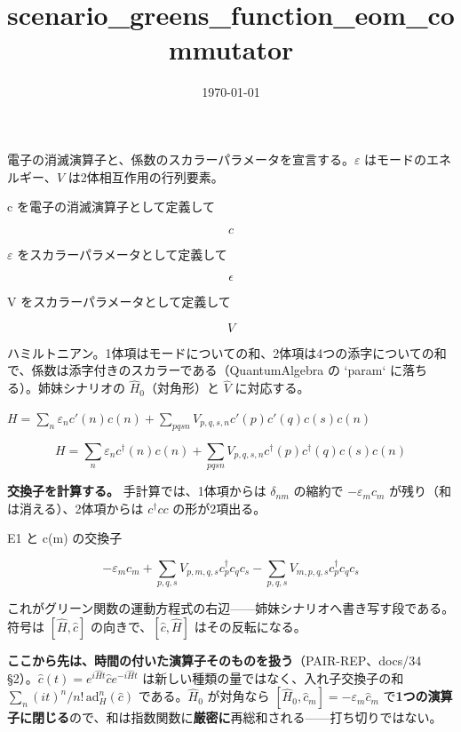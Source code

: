 \documentclass[dvipdfmx,a4paper,11pt]{jsarticle}
\title{scenario\_greens\_function\_eom\_commutator}
\date{\today}
\begin{document}
\maketitle

電子の消滅演算子と、係数のスカラーパラメータを宣言する。$\varepsilon$ はモードのエネルギー、$V$ は2体相互作用の行列要素。

c を電子の消滅演算子として定義して

\[
  c
\]

$\varepsilon$ をスカラーパラメータとして定義して

\[
  \epsilon
\]

V をスカラーパラメータとして定義して

\[
  V
\]

ハミルトニアン。1体項はモードについての和、2体項は4つの添字についての和で、係数は添字付きのスカラーである（QuantumAlgebra の `param` に落ちる）。姉妹シナリオの $\hat H_0$（対角形）と $\hat V$ に対応する。

$H = \sum_n \varepsilon_n c'(n) c(n) + \sum_{p q s n} V_{p,q,s,n} c'(p) c'(q) c(s) c(n)$

\begin{equation}
  H = \sum_n \varepsilon_n c^{\dagger}(n) c(n) + \sum_{p q s n} V_{p,q,s,n} c^{\dagger}(p) c^{\dagger}(q) c(s) c(n)
  \label{eq:E1}
\end{equation}

\textbf{交換子を計算する。} 手計算では、1体項からは $\delta_{nm}$ の縮約で $-\varepsilon_m c_m$ が残り（和は消える）、2体項からは $c^\dagger c c$ の形が2項出る。

E1 と c(m) の交換子

\begin{equation}
  - \varepsilon_{m} {c}_{m} + \sum_{p,q,s} V_{p,m,q,s} {c}_{p}^{\dagger} {c}_{q} {c}_{s} - \sum_{p,q,s} V_{m,p,q,s} {c}_{p}^{\dagger} {c}_{q} {c}_{s}
  \label{eq:E2}
\end{equation}

これがグリーン関数の運動方程式の右辺——姉妹シナリオへ書き写す段である。符号は $[\hat H,\hat c]$ の向きで、$[\hat c,\hat H]$ はその反転になる。

\textbf{ここから先は、時間の付いた演算子そのものを扱う}（PAIR-REP、docs/34 §2）。$\hat c(t)=e^{i\hat Ht}\hat ce^{-i\hat Ht}$ は新しい種類の量ではなく、入れ子交換子の和 $\sum_n (it)^n/n!\,\mathrm{ad}_H^n(\hat c)$ である。$\hat H_0$ が対角なら $[\hat H_0,\hat c_m]=-\varepsilon_m\hat c_m$ で\textbf{1つの演算子に閉じる}ので、和は指数関数に\textbf{厳密に}再総和される——打ち切りではない。
\end{document}

